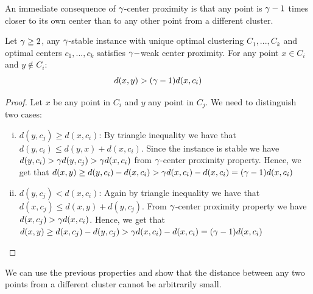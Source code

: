 An immediate consequence of $\gamma$-center proximity  is that any point is $\gamma-1$ times closer to its own center than to any other point from a different cluster.

\begin{lemma}\label{WCprox}
Let $\gamma \ge 2$, any $\gamma$-stable instance with unique optimal clustering $C_1, . . . , C_k$ and optimal centers $c_1, . . . , c_k$ satisfies $\gamma-$weak center proximity. For any point $x\in C_i$ and $y \notin C_i$:
\[d(x,y)>(\gamma -1) d(x,c_i) \]
\end{lemma}

\begin{proof}
Let $x$ be any point in $C_i$ and $y$ any point in $C_j$. We need to distinguish two cases:
\begin{enumerate}[(i)]
    \item $d(y,c_j)\ge d(x,c_i)$: By triangle inequality we have that $d(y,c_i)\le d(y,x)+d(x,c_i)$. Since the instance is stable we have $d(y,c_i)>\gamma d(y,c_j)>\gamma d(x,c_i)$ from $\gamma$-center proximity property. Hence, we get that $d(x,y) \ge d(y,c_i) - d(x,c_i) > \gamma d(x,c_i) -d(x,c_i) = (\gamma-1) d(x,c_i)$
    \item $d(y,c_j) <  d(x,c_i)$: Again by triangle inequality we have that $d(x,c_j)\le d(x,y)+d(y,c_j)$. From $\gamma$-center proximity property we have $d(x,c_j)>\gamma d(x,c_i)$. Hence, we get that $d(x,y) \ge d(x,c_j) - d(y,c_j) > \gamma d(x,c_i) - d(x,c_i) = (\gamma-1) d(x,c_i)$
\end{enumerate}
\end{proof}

We can use the previous properties and show that the distance between any two points from a different cluster cannot be arbitrarily small.

